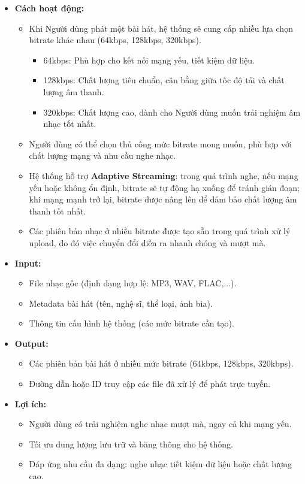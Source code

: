 \documentclass[a4paper]{article}
\begin{document}
\begin{itemize}
	\item \textbf{Cách hoạt động:}
	      \begin{itemize}
		      \item Khi Người dùng phát một bài hát, hệ thống sẽ cung cấp nhiều lựa chọn bitrate khác nhau (64kbps, 128kbps, 320kbps).
		            \begin{itemize}
			            \item 64kbps: Phù hợp cho kết nối mạng yếu, tiết kiệm dữ liệu.
			            \item 128kbps: Chất lượng tiêu chuẩn, cân bằng giữa tốc độ tải và chất lượng âm thanh.
			            \item 320kbps: Chất lượng cao, dành cho Người dùng muốn trải nghiệm âm nhạc tốt nhất.
		            \end{itemize}
		      \item Người dùng có thể chọn thủ công mức bitrate mong muốn, phù hợp với chất lượng mạng và nhu cầu nghe nhạc.
		      \item Hệ thống hỗ trợ \textbf{Adaptive Streaming}: trong quá trình nghe, nếu mạng yếu hoặc không ổn định, bitrate sẽ tự động hạ xuống để tránh gián đoạn; khi mạng mạnh trở lại, bitrate được nâng lên để đảm bảo chất lượng âm thanh tốt nhất.
		      \item Các phiên bản nhạc ở nhiều bitrate được tạo sẵn trong quá trình xử lý upload, do đó việc chuyển đổi diễn ra nhanh chóng và mượt mà.
	      \end{itemize}
	\item \textbf{Input:}
	      \begin{itemize}
		      \item File nhạc gốc (định dạng hợp lệ: MP3, WAV, FLAC,...).
		      \item Metadata bài hát (tên, nghệ sĩ, thể loại, ảnh bìa).
		      \item Thông tin cấu hình hệ thống (các mức bitrate cần tạo).
	      \end{itemize}

	\item \textbf{Output:}
	      \begin{itemize}
		      \item Các phiên bản bài hát ở nhiều mức bitrate (64kbps, 128kbps, 320kbps).
		      \item Đường dẫn hoặc ID truy cập các file đã xử lý để phát trực tuyến.
	      \end{itemize}


	\item \textbf{Lợi ích:}
	      \begin{itemize}
		      \item Người dùng có trải nghiệm nghe nhạc mượt mà, ngay cả khi mạng yếu.
		      \item Tối ưu dung lượng lưu trữ và băng thông cho hệ thống.
		      \item Đáp ứng nhu cầu đa dạng: nghe nhạc tiết kiệm dữ liệu hoặc chất lượng cao.
	      \end{itemize}
\end{itemize}
\end{document}
